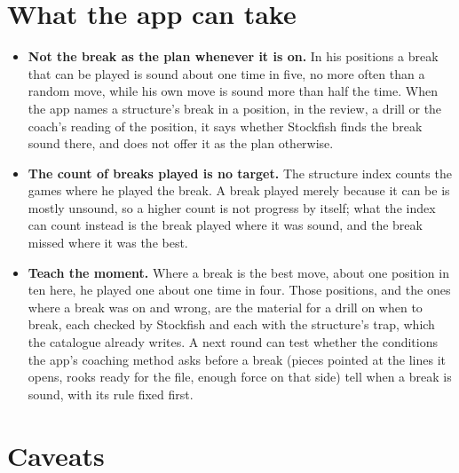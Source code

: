 \documentclass[11pt]{article}
\begin{document}
\section{What the app can take}

\begin{itemize}[nosep]
\item \textbf{Not the break as the plan whenever it is on.} In his positions a break that can be
  played is sound about one time in five, no more often than a random move, while his own move is
  sound more than half the time. When the app names a structure's break in a position, in the
  review, a drill or the coach's reading of the position, it says whether Stockfish finds the
  break sound there, and does not offer it as the plan otherwise.
\item \textbf{The count of breaks played is no target.} The structure index counts the games
  where he played the break. A break played merely because it can be is mostly unsound, so a
  higher count is not progress by itself; what the index can count instead is the break played
  where it was sound, and the break missed where it was the best.
\item \textbf{Teach the moment.} Where a break is the best move, about one position in ten here,
  he played one about one time in four. Those positions, and the ones where a break was on and
  wrong, are the material for a drill on when to break, each checked by Stockfish and each with
  the structure's trap, which the catalogue already writes. A next round can test whether the
  conditions the app's coaching method asks before a break (pieces pointed at the lines it opens,
  rooks ready for the file, enough force on that side) tell when a break is sound, with its rule
  fixed first.
\end{itemize}

\section{Caveats}
\end{document}

